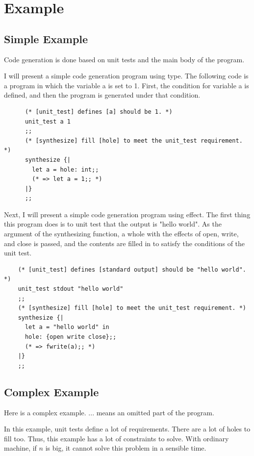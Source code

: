 \documentclass[12pt, a4paper, titlepage]{report}
\begin{document}
  \section{Example}\label{section:example}
  \subsection{Simple Example}\label{subsection:simple_example}
  Code generation is done based on unit tests and the main body of the program.

  I will present a simple code generation program using type.
  The following code is a program in which the variable a is set to 1.
  First, the condition for variable a is defined, and then the program is generated under that condition.
  \begin{verbatim}
      (* [unit_test] defines [a] should be 1. *)
      unit_test a 1
      ;;
      (* [synthesize] fill [hole] to meet the unit_test requirement. *)
      synthesize {|
        let a = hole: int;;
        (* => let a = 1;; *)
      |}
      ;;
    \end{verbatim}

  Next, I will present a simple code generation program using effect.
  The first thing this program does is to unit test that the output is "hello world".
  As the argument of the synthesizing function, a whole with the effects of open, write, and close is passed, and the contents are filled in to satisfy the conditions of the unit test.
  \begin{verbatim}
    (* [unit_test] defines [standard output] should be "hello world". *)
    unit_test stdout "hello world"
    ;;
    (* [synthesize] fill [hole] to meet the unit_test requirement. *)
    synthesize {|
      let a = "hello world" in
      hole: {open write close};;
      (* => fwrite(a);; *)
    |}
    ;;
  \end{verbatim}

  \subsection{Complex Example}\label{subsection:complex_example}

  Here is a complex example.
  $...$ means an omitted part of the program.

  In this example, unit tests define a lot of requirements.
  There are a lot of holes to fill too.
  Thus, this example has a lot of constraints to solve.
  With ordinary machine, if $n$ is big, it cannot solve this problem in a sensible time.
\end{document}
